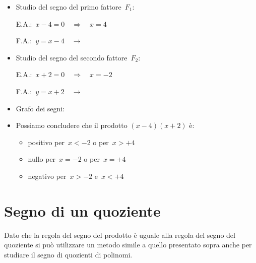 \begin{esempio}
\begin{itemize} [noitemsep]
 \item Studio del segno del primo fattore~$F_1$:\\
 \begin{minipage}{.45\textwidth}
  E.A.:~$x - 4 = 0 \quad \Rightarrow \quad x = 4$
 \end{minipage}
 \begin{minipage}{.25\textwidth}
  F.A.:~$y = x - 4 \quad \rightarrow$
 \end{minipage}
 \begin{minipage}{.3\textwidth}
  
 \end{minipage}
 \item Studio del segno del secondo fattore~$F_2$:\\
 \begin{minipage}{.45\textwidth}
  E.A.:~$x + 2 = 0 \quad \Rightarrow \quad x=-2$
 \end{minipage}
 \begin{minipage}{.25\textwidth}
  F.A.:~$y = x + 2 \quad \rightarrow$
 \end{minipage}
 \begin{minipage}{.3\textwidth}
  
 \end{minipage}
 \item Grafo dei segni:
 
 \item Possiamo concludere che il prodotto $(x -4)(x +2)$ è:
\begin{itemize} [noitemsep]
 \item positivo per~$x < -2$ o per~$x > +4$
 \item nullo per~$x = -2$ o per~$x = +4$
 \item negativo per~$x > -2$ e~$x < +4$
\end{itemize}
\end{itemize}

 \end{esempio}

\section{Segno di un quoziente}
\label{sec:dis_quoziente}

Dato che la regola del segno del prodotto è uguale alla regola del segno del
quoziente si può utilizzare un metodo simile a quello presentato sopra anche
per studiare il segno di quozienti di polinomi.

